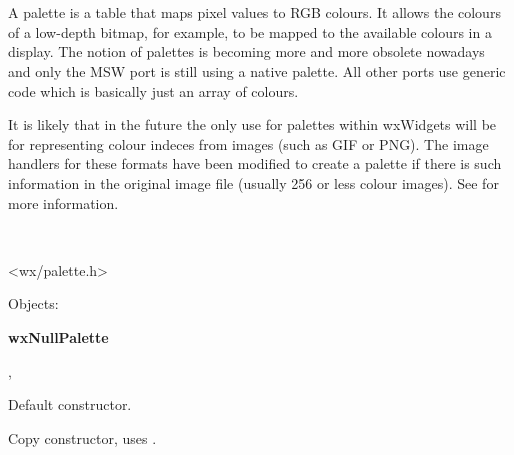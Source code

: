
\section{}\label{wxpalette}

A palette is a table that maps pixel values to RGB colours. It allows the
colours of a low-depth bitmap, for example, to be mapped to the available
colours in a display. The notion of palettes is becoming more and more
obsolete nowadays and only the MSW port is still using a native palette.
All other ports use generic code which is basically just an array of
colours. 

It is likely that in the future the only use for palettes within wxWidgets
will be for representing colour indeces from images (such as GIF or PNG).
The image handlers for these formats have been modified to create a palette
if there is such information in the original image file (usually 256 or less
colour images). See  for more information.


\\


<wx/palette.h>


Objects:

{\bf wxNullPalette}


, 


\label{wxpalettector}


Default constructor.


Copy constructor, uses .

